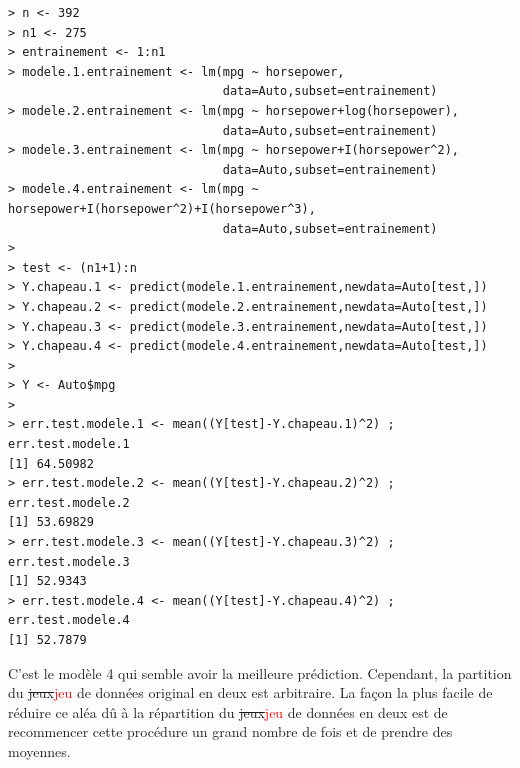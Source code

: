 \documentclass[11pt]{article}
\begin{document}
\begin{verbatim}
> n <- 392
> n1 <- 275
> entrainement <- 1:n1
> modele.1.entrainement <- lm(mpg ~ horsepower,
                              data=Auto,subset=entrainement)
> modele.2.entrainement <- lm(mpg ~ horsepower+log(horsepower),
                              data=Auto,subset=entrainement)
> modele.3.entrainement <- lm(mpg ~ horsepower+I(horsepower^2),
                              data=Auto,subset=entrainement)
> modele.4.entrainement <- lm(mpg ~ horsepower+I(horsepower^2)+I(horsepower^3),
                              data=Auto,subset=entrainement)
> 
> test <- (n1+1):n
> Y.chapeau.1 <- predict(modele.1.entrainement,newdata=Auto[test,])
> Y.chapeau.2 <- predict(modele.2.entrainement,newdata=Auto[test,])
> Y.chapeau.3 <- predict(modele.3.entrainement,newdata=Auto[test,])
> Y.chapeau.4 <- predict(modele.4.entrainement,newdata=Auto[test,])
> 
> Y <- Auto$mpg
> 
> err.test.modele.1 <- mean((Y[test]-Y.chapeau.1)^2) ; err.test.modele.1
[1] 64.50982
> err.test.modele.2 <- mean((Y[test]-Y.chapeau.2)^2) ; err.test.modele.2
[1] 53.69829
> err.test.modele.3 <- mean((Y[test]-Y.chapeau.3)^2) ; err.test.modele.3
[1] 52.9343
> err.test.modele.4 <- mean((Y[test]-Y.chapeau.4)^2) ; err.test.modele.4
[1] 52.7879
\end{verbatim}

\noindent C'est le mod\`ele 4 qui semble avoir la meilleure pr\'ediction. Cependant, la partition du \sout{jeux}\textcolor{red}{jeu} de donn\'ees original en deux est arbitraire. La fa\c{c}on la plus facile de r\'eduire ce al\'ea d\^u \`a la r\'epartition du \sout{jeux}\textcolor{red}{jeu} de donn\'ees en deux est de recommencer cette proc\'edure un grand nombre de fois et de prendre des moyennes. 
\end{document}
